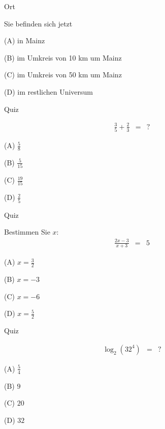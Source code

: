 \documentclass[german]{beamer}
\newcommand{\bq}{\begin{eqnarray*}}
\newcommand{\eq}{\end{eqnarray*}}
\begin{document}
\begin{frame}{Ort}

Sie befinden sich jetzt 
\begin{description}
\item{(A)} in Mainz
\item{(B)} im Umkreis von 10 km um Mainz
\item{(C)} im Umkreis von 50 km um Mainz
\item{(D)} im restlichen Universum
\end{description}

\end{frame}

\begin{frame}{Quiz}

\bq
 \frac{3}{5} + \frac{2}{3} & = & ?
\eq 
\begin{description}
\item{(A)} $\frac{5}{8}$
\item{(B)} $\frac{5}{15}$
\item{(C)} $\frac{19}{15}$
\item{(D)} $\frac{2}{5}$
\end{description}

\end{frame}


\begin{frame}{Quiz}

Bestimmen Sie $x$:
\bq
 \frac{2x-3}{x+3} & = & 5
\eq 
\begin{description}
\item{(A)} $x=\frac{3}{2}$
\item{(B)} $x=-3$
\item{(C)} $x=-6$
\item{(D)} $x=\frac{5}{2}$
\end{description}

\end{frame}

\begin{frame}{Quiz}

\bq
 \log_2\left(32^4\right) & = & ?
\eq 
\begin{description}
\item{(A)} $\frac{5}{4}$
\item{(B)} $9$
\item{(C)} $20$
\item{(D)} $32$
\end{description}

\end{frame}
\end{document}
